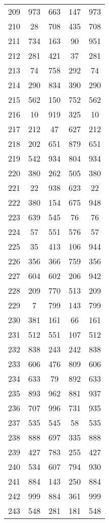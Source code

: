 \documentclass[a4paper,10pt,ngerman]{scrartcl}
\begin{document}
\begin{longtable}[c]{c|c|c|c|c}
    209 & 973 & 663 & 147 & 973 \\
    210 & 28 & 708 & 435 & 708 \\
    211 & 734 & 163 & 90 & 951 \\
    212 & 281 & 421 & 37 & 281 \\
    213 & 74 & 758 & 292 & 74 \\
    214 & 290 & 834 & 390 & 290 \\
    215 & 562 & 150 & 752 & 562 \\
    216 & 10 & 919 & 325 & 10 \\
    217 & 212 & 47 & 627 & 212 \\
    218 & 202 & 651 & 879 & 651 \\
    219 & 542 & 934 & 804 & 934 \\
    220 & 380 & 262 & 505 & 380 \\
    221 & 22 & 938 & 623 & 22 \\
    222 & 380 & 154 & 675 & 948 \\
    223 & 639 & 545 & 76 & 76 \\
    224 & 57 & 551 & 576 & 57 \\
    225 & 35 & 413 & 106 & 944 \\
    226 & 356 & 366 & 759 & 356 \\
    227 & 604 & 602 & 206 & 942 \\
    228 & 209 & 770 & 513 & 209 \\
    229 & 7 & 799 & 143 & 799 \\
    230 & 381 & 161 & 66 & 161 \\
    231 & 512 & 551 & 107 & 512 \\
    232 & 838 & 243 & 242 & 838 \\
    233 & 606 & 476 & 809 & 606 \\
    234 & 633 & 79 & 892 & 633 \\
    235 & 893 & 962 & 881 & 937 \\
    236 & 707 & 996 & 731 & 935 \\
    237 & 535 & 545 & 58 & 535 \\
    238 & 888 & 697 & 335 & 888 \\
    239 & 427 & 783 & 255 & 427 \\
    240 & 534 & 607 & 794 & 930 \\
    241 & 884 & 143 & 250 & 884 \\
    242 & 999 & 884 & 361 & 999 \\
    243 & 548 & 281 & 181 & 548 \\

\end{longtable}
\end{document}
